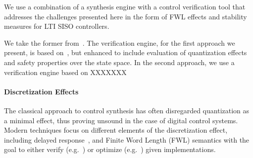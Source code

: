 \documentclass[runningheads,a4paper]{llncs}
\begin{document}
We use a combination of a synthesis engine with a control
verification tool that addresses the challenges presented here in the
form of FWL effects and stability measures for LTI SISO controllers.

We take the former from~\cite{DBLP:conf/lpar/DavidKL15}. The verification engine, for
the first approach we present, is 
based on~\cite{Monteiro16}, but 
enhanced to include evaluation of quantization effects and safety properties
over the state space. In the second approach, we use a verification engine
based on XXXXXXX




\paragraph{Discretization Effects}

The classical approach to control synthesis has often disregarded
quantization as a minimal effect, thus proving unsound in the case of digital control systems.
Modern techniques focus on different elements of the discretization effect, including delayed
response~\cite{Duggirala2015}, and Finite Word Length (FWL) semantics with
the goal to either verify (e.g.~\cite{daes20161}) or optimize
(e.g.~\cite{oudjida2014design}) given implementations.
\end{document}
